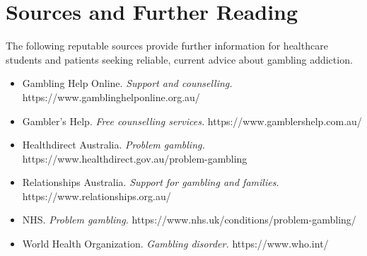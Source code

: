 \section*{Sources and Further Reading}
The following reputable sources provide further information for healthcare students and patients seeking reliable, current advice about gambling addiction.
\begin{itemize}
    \item Gambling Help Online. \textit{Support and counselling.} https://www.gamblinghelponline.org.au/
    \item Gambler's Help. \textit{Free counselling services.} https://www.gamblershelp.com.au/
    \item Healthdirect Australia. \textit{Problem gambling.} https://www.healthdirect.gov.au/problem-gambling
    \item Relationships Australia. \textit{Support for gambling and families.} https://www.relationships.org.au/
    \item NHS. \textit{Problem gambling.} https://www.nhs.uk/conditions/problem-gambling/
    \item World Health Organization. \textit{Gambling disorder.} https://www.who.int/
\end{itemize}
